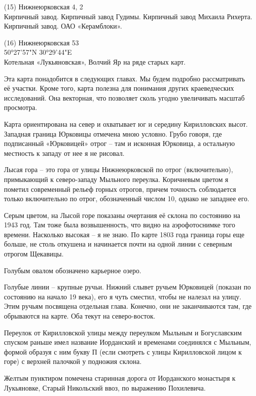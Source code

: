 \begin{flushleft}
\medskip

(15) Нижнеюрковская 4, 2\\
Кирпичный завод. Кирпичный завод Гудимы. Кирпичный завод Михаила Рихерта. Кирпичный завод. ОАО «Керамблоки».\\

\medskip

(16) Нижнеюрковская 53\\
50°27'57"N 30°29'44"E\\
Котельная «Лукьяновская», Волчий Яр на ряде старых карт.
\end{flushleft}


Эта карта понадобится в следующих главах. Мы будем подробно рассматривать её участки. Кроме того, карта полезна для понимания других краеведческих исследований. Она векторная, что позволяет сколь угодно увеличивать масштаб просмотра. 

Карта ориентирована на север и охватывает юг и середину Кирилловских высот. Западная граница Юрковицы отмечена мною условно. Грубо говоря, где подписанный «Юрковицей» отрог – там и исконная Юрковица, а остальную местность к западу от нее я не рисовал.

Лысая гора – это гора от улицы Нижнеюрковской по отрог (включительно), примыкающий к северо-западу Мыльного переулка. Коричневым цветом я пометил современный рельеф горных отрогов, причем точность соблюдается только включительно по отрог, обозначенный числом 10, однако не западнее его.

Серым цветом, на Лысой горе показаны очертания её склона по состоянию на 1943 год. Там тоже была возвышенность, что видно на аэрофотоснимке того времени. Насколько высокая – я не знаю. По карте 1803 года граница горы еще больше, не столь откушена и начинается почти на одной линии с северным отрогом Щекавицы.

Голубым овалом обозначено карьерное озеро.

Голубые линии – крупные ручьи. Нижний слывет ручьем Юрковицей (показан по состоянию на начало 19 века), его я чуть сместил, чтобы не налезал на улицу. Этим ручьям посвящена отдельная глава. Конечно, они не заканчиваются там, где обрываются на карте. Оба текут на северо-восток.
 
Переулок от Кирилловской улицы между переулком Мыльным и Богуславским спуском раньше имел название Иорданский и временами соединялся с Мыльным, формой образуя с ним букву П (если смотреть с улицы Кирилловской лицом к горе) с верхней палочкой у подножия склона.

Желтым пунктиром помечена старинная дорога от Иорданского монастыря к Лукьяновке, Старый Никольский ввоз, по выражению Похилевича.

